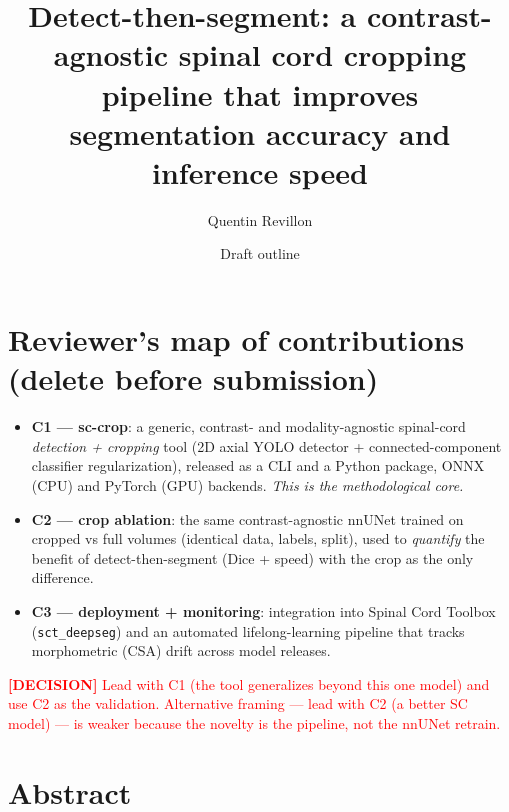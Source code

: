 \documentclass[11pt]{article}
\title{Detect-then-segment: a contrast-agnostic spinal cord cropping
pipeline that improves segmentation accuracy and inference speed
\\ \large \DECISION{title is a placeholder — settle once results are final}}
\author{Quentin Revillon \and \FUTURE{co-authors}}
\date{Draft outline}
\newcommand{\WRITE}[1]{\textcolor{blue}{\textbf{[WRITE]} #1}}
\newcommand{\DECISION}[1]{\textcolor{red}{\textbf{[DECISION]} #1}}
\begin{document}
\maketitle

\section*{Reviewer's map of contributions (delete before submission)}
\begin{itemize}
  \item \textbf{C1 — sc-crop}: a generic, contrast- and modality-agnostic
        spinal-cord \emph{detection + cropping} tool (2D axial YOLO detector
        + connected-component classifier regularization), released as a CLI
        and a Python package, ONNX (CPU) and PyTorch (GPU) backends.
        \emph{This is the methodological core.}
  \item \textbf{C2 — crop ablation}: the same contrast-agnostic nnUNet trained
        on cropped vs full volumes (identical data, labels, split), used to
        \emph{quantify} the benefit of detect-then-segment (Dice + speed) with the
        crop as the only difference.
  \item \textbf{C3 — deployment + monitoring}: integration into Spinal Cord
        Toolbox (\texttt{sct\_deepseg}) and an automated lifelong-learning
        pipeline that tracks morphometric (CSA) drift across model releases.
\end{itemize}
\DECISION{Lead with C1 (the tool generalizes beyond this one model) and use
C2 as the validation. Alternative framing — lead with C2 (a better SC model)
— is weaker because the novelty is the pipeline, not the nnUNet retrain.}

\section*{Abstract}\label{sec:abstract}
%
\end{document}
